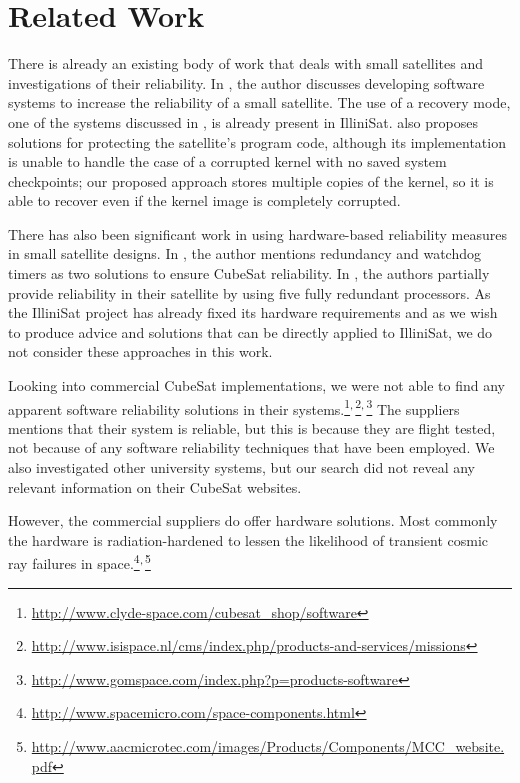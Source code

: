 \section{Related Work}\label{sec:related_work}
There is already an existing body of work that deals with small satellites and
investigations of their reliability.  In \cite{odegaard2013error}, the author
discusses developing software systems to increase the reliability of a small satellite.
The use of a recovery mode, one of the systems discussed in
\cite{odegaard2013error}, is already present in IlliniSat.
\cite{odegaard2013error} also proposes solutions for protecting the satellite's
program code, although its implementation is unable to handle the case of a
corrupted kernel with no saved system checkpoints; our proposed approach stores
multiple copies of the kernel, so it is able to recover even if the kernel image
is completely corrupted.

There has also been significant work in using hardware-based reliability
measures in small satellite designs.  In \cite{toorian2008cubesat}, the author mentions redundancy and watchdog timers as two solutions to ensure CubeSat reliability.  In \cite{passerone2008design}, the authors partially provide reliability in their satellite by using five fully redundant processors.   As the IlliniSat project has already fixed its hardware requirements and as we wish to produce advice and solutions that can be directly applied to IlliniSat, we do not consider these approaches in this work.

Looking into commercial CubeSat implementations, we were not able to 
find any apparent software reliability solutions in their systems.\footnote{\url{http://www.clyde-space.com/cubesat_shop/software}}$^\textnormal{,}$\footnote{\url{http://www.isispace.nl/cms/index.php/products-and-services/missions}}$^\textnormal{,}$\footnote{\url{http://www.gomspace.com/index.php?p=products-software}}
The suppliers mentions that their system is reliable, but this is because
they are flight tested, not because of any software reliability techniques that
have been employed.  We also investigated other university systems, but our
search did not reveal any relevant information on their CubeSat websites.

However, the commercial suppliers do offer hardware solutions. Most commonly
the hardware is radiation-hardened to lessen the likelihood of transient cosmic ray
failures in space.\footnote{\url{http://www.spacemicro.com/space-components.html}}$^\textnormal{,}$\footnote{\url{http://www.aacmicrotec.com/images/Products/Components/MCC_website.pdf}}




